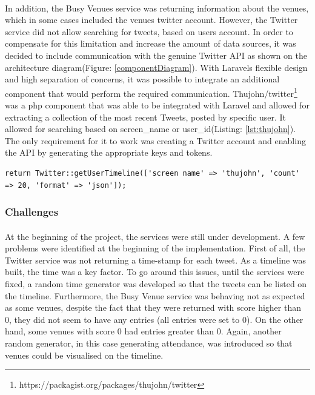 \documentclass{l4proj}
\begin{document}
\paragraph{}
In addition, the Busy Venues service was returning information about the venues, which in some cases included the venue\textquotesingle s twitter account. However, the Twitter service did not allow searching for tweets, based on user\textquotesingle s account. In order to compensate for this limitation and increase the amount of data sources, it was decided to include communication with the genuine Twitter API as shown on the architecture diagram(Figure: \ref{componentDiagram}). With Laravel\textquotesingle s flexible design and high separation of concerns, it was possible to integrate an additional component that would perform the required communication. Thujohn/twitter\footnote{https://packagist.org/packages/thujohn/twitter} was a php component that was able to be integrated with Laravel and allowed for extracting a collection of the most recent Tweets, posted by specific user. It allowed for searching based on screen\_name or user\_id(Listing: \ref{lst:thujohn}). The only requirement for it to work was creating a Twitter account and enabling the API by generating the appropriate keys and tokens. 
\begin{lstlisting}[caption={Getting tweets from twitter account},label={lst:thujohn}]
return Twitter::getUserTimeline(['screen name' => 'thujohn', 'count' => 20, 'format' => 'json']);
\end{lstlisting}

\subsubsection{Challenges}
\paragraph{}
At the beginning of the project, the services were still under development. A few problems were identified at the beginning of the implementation. First of all, the Twitter service was not returning a time-stamp for each tweet. As a timeline was built, the time was a key factor. To go around this issues, until the services were fixed, a random time generator was developed so that the tweets can be listed on the timeline. Furthermore, the Busy Venue service was behaving not as expected as some venues, despite the fact that they were returned with score higher than 0, they did not seem to have any entries (all entries were set to 0). On the other hand, some venues with score 0 had entries greater than 0. Again, another random generator, in this case generating attendance, was introduced so that venues could be visualised on the timeline. 
\end{document}
